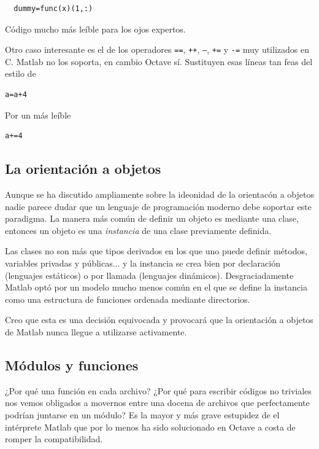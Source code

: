 \begin{lstlisting}
  dummy=func(x)(1,:)
\end{lstlisting}

Código mucho más leíble para los ojos expertos.

Otro caso interesante es el de los operadores \texttt{==},
\texttt{++}, \texttt{--}, \texttt{+=} y \texttt{-=} muy utilizados en
C.  Matlab no los soporta, en cambio Octave sí. Sustituyen esas líneas tan
feas del estilo de 

\begin{lstlisting}
a=a+4
\end{lstlisting}

Por un más leíble

\begin{lstlisting}
a+=4
\end{lstlisting}


\subsection{La orientación a objetos}

Aunque se ha discutido ampliamente sobre la ideonidad de la orientacón
a objetos nadie parece dudar que un lenguaje de programación moderno
debe soportar este paradigma. La manera más común de definir un objeto
es mediante una clase, entonces un objeto es una \emph{instancia} de
una clase previamente definida.

Las clases no son más que tipos derivados en los que uno puede definir
métodos, variables privadas y públicas... y la instancia se crea bien
por declaración (lenguajes estáticos) o por llamada (lenguajes
dinámicos).  Desgraciadamente Matlab optó por un modelo mucho menos
común en el que se define la instancia como una estructura de
funciones ordenada mediante directorios.

Creo que esta es una decisión equivocada y provocará que la
orientación a objetos de Matlab nunca llegue a utilizarse activamente.

\subsection{Módulos y funciones}

¿Por qué una función en cada archivo? ¿Por qué para escribir códigos
no triviales nos vemos obligados a movernos entre una docena de
archivos que perfectamente podrían juntarse en un módulo?  Es la mayor
y más grave estupidez de el intérprete Matlab que por lo menos ha sido
solucionado en Octave a costa de romper la compatibilidad.


